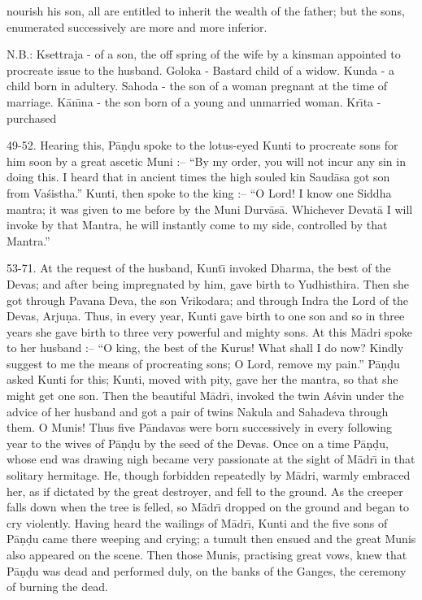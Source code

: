 nourish his son, all are entitled to inherit the wealth of the father; but the sons, enumerated successively are more and more inferior.

N.B.: Ksettraja - of a son, the off spring of the wife by a kinsman appointed to procreate issue to the husband.
Goloka - Bastard child of a widow.
Kunda - a child born in adultery.
Sahoda - the son of a woman pregnant at the time of marriage.
K\=an\={\i}na - the son born of a young and unmarried woman.
Kr\={\i}ta - purchased

49-52. Hearing this, P\=a\d{n}\d{d}u spoke to the lotus-eyed Kunti to procreate sons for him soon by a great ascetic Muni :-- ``By my order, you will not incur any sin in doing this. I heard that in ancient times the high souled kin Saud\=asa got son from Va\'sistha.'' Kunti, then spoke to the king :-- ``O Lord! I know one Siddha mantra; it was given to me before by the Muni Durv\=as\=a. Whichever Devat\=a I will invoke by that Mantra, he will instantly come to my side, controlled by that Mantra.''

53-71. At the request of the husband, Kunt\={\i} invoked Dharma, the best of the Devas; and after being impregnated by him, gave birth to Yudhisthira. Then she got through Pavana Deva, the son Vrikodara; and through Indra the Lord of the Devas, Arju\d{n}a. Thus, in every year, Kunti gave birth to one son and so in three years she gave birth to three very powerful and mighty sons. At this M\=adri spoke to her husband :-- ``O king, the best of the Kurus! What shall I do now? Kindly suggest to me the means of procreating sons; O Lord, remove my pain.'' P\=a\d{n}\d{d}u asked Kunti for this; Kunti, moved with pity, gave her the mantra, so that she might get one son. Then the beautiful M\=adr\={\i}, invoked the twin A\'svin under the advice of her husband and got a pair of twins Nakula and Sahadeva through them. O Munis! Thus five P\=andavas were born successively in every following year to the wives of P\=a\d{n}\d{d}u by the seed of the Devas. Once on a time P\=a\d{n}\d{d}u, whose end was drawing nigh became very passionate at the sight of M\=adr\={\i} in that solitary hermitage. He, though forbidden repeatedly by M\=adri, warmly embraced her, as if dictated by the great destroyer, and fell to the ground. As the creeper falls down when the tree is felled, so M\=adr\={\i} dropped on the ground and began to cry violently. Having heard the wailings of M\=adr\={\i}, Kunti and the five sons of P\=a\d{n}\d{d}u came there weeping and crying; a tumult then ensued and the great Munis also appeared on the scene. Then those Munis, practising great vows, knew that P\=a\d{n}\d{d}u was dead and performed duly, on the banks of the Ganges, the ceremony of burning the dead.

